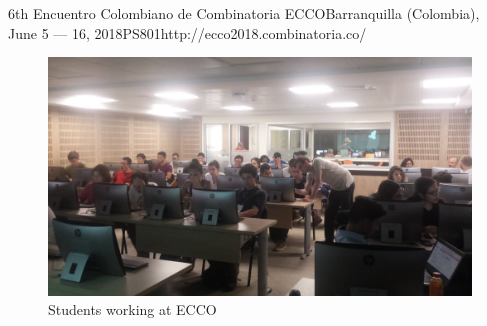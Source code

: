 \begin{event}{6th Encuentro Colombiano de Combinatoria }{ECCO}{Barranquilla (Colombia), June 5 --- 16, 2018}{PS}{80}{1}{http://ecco2018.combinatoria.co/}
\begin{figure}[ht]
\includegraphics[scale=.2]{ECCO.jpg}
\caption*{Students working at ECCO}
\end{figure}



\end{event}